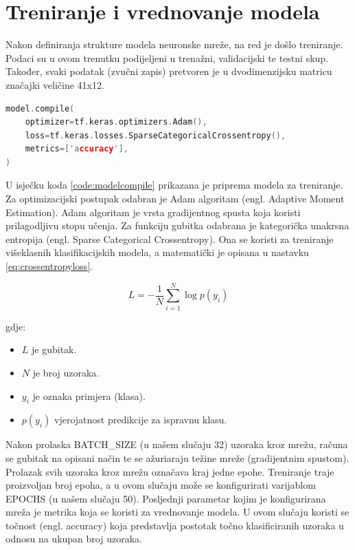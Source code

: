 \section{Treniranje i vrednovanje modela}

Nakon definiranja strukture modela neuronske mreže, na red je došlo treniranje. Podaci 
su u ovom trenutku podijeljeni u trenažni, validacijski te testni skup. Također,
svaki podatak (zvučni zapis) pretvoren je u dvodimenzijsku matricu značajki veličine 41x12.


\begin{lstlisting}[language=C++, caption=Konfiguracija za treniranje, label=code:modelcompile]
model.compile(
    optimizer=tf.keras.optimizers.Adam(),
    loss=tf.keras.losses.SparseCategoricalCrossentropy(),
    metrics=['accuracy'],
)
\end{lstlisting}

U isječku koda \ref{code:modelcompile} prikazana je priprema modela za treniranje.
Za optimizacijski postupak odabran je Adam algoritam (engl. Adaptive Moment Estimation).
Adam algoritam je vrsta gradijentnog spusta koja koristi prilagodljivu stopu učenja.
Za funkciju gubitka odabrana je kategorička unakrsna entropija (engl. Sparse Categorical
Crossentropy). Ona se koristi za treniranje višeklasnih klasifikacijskih modela, a
matematički je opisana u nastavku \ref{eq:crossentropyloss}.

\begin{equation}
    \label{eq:crossentropyloss}
    L = - \frac{1}{N} \sum_{i=1}^{N} \log p(y_i)
\end{equation}

gdje:
\begin{itemize}
    \item \( L \) je gubitak.
    \item \( N \) je broj uzoraka.
    \item \( y_i \) je oznaka primjera (klasa).
    \item \( p(y_i) \) vjerojatnost predikcije za ispravnu klasu.
\end{itemize}

Nakon prolaska BATCH\_SIZE (u našem slučaju 32) uzoraka kroz mrežu, računa se
gubitak na opisani način te se ažuriaraju težine mreže (gradijentnim spustom).
Prolazak svih uzoraka kroz mrežu označava kraj jedne epohe. Treniranje traje 
proizvoljan broj epoha, a u ovom slučaju može se konfigurirati varijablom EPOCHS
(u našem slučaju 50).
Posljednji parametar kojim je konfigurirana mreža je metrika koja se koristi za
vrednovanje modela. U ovom slučaju koristi se točnost (engl. accuracy) koja
predstavlja postotak točno klasificiranih uzoraka u odnosu na ukupan broj uzoraka.

